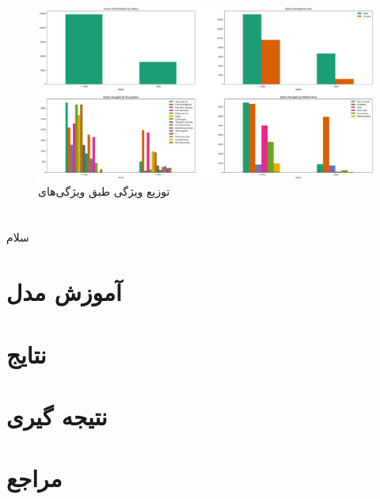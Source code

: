 \documentclass{article}
\begin{document}
	\begin{figure}[H]
		\centering
		\includegraphics[scale=0.3]{figs/Salary_grouped_dist}
		\caption{
			توزیع ویژگی 
			طبق ویژگی‌های 
		}
		\label{fig: salary grouped}
	\end{figure}
	\FloatBarrier
	\section{}
	سلام
	
	\section{آموزش مدل}
	
	\section{نتایج}
	
	\section{نتیجه گیری}
	
	\section{مراجع}
	
	
	
\end{document}
